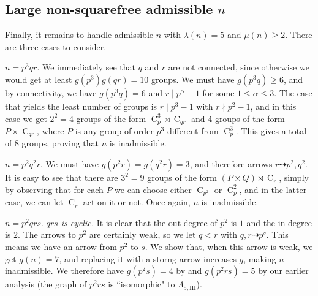 \documentclass{article}
\newcommand{\cyc}[1]{\operatorname{C}_{#1}}
\newcommand{\qlamd}{\Lambda_{5,\text{III}}}
\newcommand{\hthref}[1]{\hyperref[#1]{\thref{#1}}}
\theoremstyle{plain}
\theoremstyle{definition}
\begin{document}
\subsection{Large non-squarefree admissible $n$} 
Finally, it remains to handle admissible $n$ with $\lambda(n) = 5$ and $\mu(n) \ge 2$. There are three cases to consider.

 $n = p^3 q r$.
We immediately see that $q$ and $r$ are not connected, since otherwise we would get at least $g(p^3)g(qr) = 10$ groups. We must have $g(p^3 q) \ge 6$, and by connectivity, we have $g(p^3 q) = 6$ and $r \mid p^\alpha - 1$ for some $1 \le \alpha \le 3$. The case that yields the least number of groups is $r \mid p^3 - 1$ with $r \nmid p^2 - 1$, and in this case we get $2^2 = 4$ groups of the form $\cyc{p}^3 \rtimes \cyc{qr}$ and 4 groups of the form $P \times \cyc{qr}$, where $P$ is any group of order $p^3$ different from $\cyc{p}^3$. This gives a total of 8 groups, proving that $n$ is inadmissible.

 $n = p^2 q^2 r$.
We must have $g(p^2 r) = g(q^2 r) = 3$, and therefore arrows $r \dashrightarrow p^2, q^2$. It is easy to see that there are $3^2 = 9$ groups of the form $(P \times Q) \rtimes \cyc{r}$, simply by observing that for each $P$ we can choose either $\cyc{p^2}\text{ or }\cyc{p}^2$, and in the latter case, we can let $\cyc{r}$ act on it or not. Once again, $n$ is inadmissible.
 
 $n = p^2 q r s$.
\nopagebreak[4]
 \emph{$qrs$ is cyclic.} It is clear that the out-degree of $p^2$ is $1$ and the in-degree is $2$. The arrows to $p^2$ are certainly weak, so we let $q < r$ with $q, r \dashrightarrow p^s$. This means we have an arrow from $p^2$ to $s$. We show that, when this arrow is weak, we get $g(n) = 7$, and replacing it with a storng arrow increases $g$, making $n$ inadmissible. We therefore  have $g(p^2 s) = 4$ by \hthref{euppq} and $g(p^2 r s) = 5$ by our earlier analysis (the graph of $p^2 r s$ is ``isomorphic" to $\qlamd$).
\end{document}
